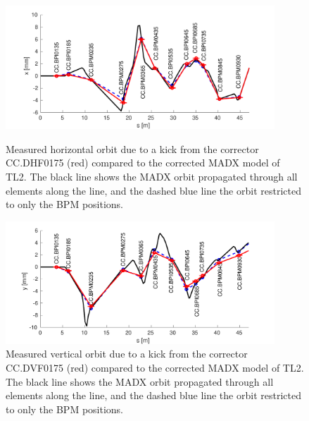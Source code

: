 \begin{figure}
  \centering
  \includegraphics[width=0.9\textwidth]{Figures/optics/modelCorrectedH}
  \caption{Measured horizontal orbit due to a kick from the corrector CC.DHF0175 (red) compared to the corrected MADX model of TL2. The black line shows the MADX orbit propagated through all elements along the line, and the dashed blue line the orbit restricted to only the BPM positions.}
  \label{f:modelCorrectedH}
  \includegraphics[width=0.9\textwidth]{Figures/optics/modelCorrectedV}
  \caption{Measured vertical orbit due to a kick from the corrector CC.DVF0175 (red) compared to the corrected MADX model of TL2. The black line shows the MADX orbit propagated through all elements along the line, and the dashed blue line the orbit restricted to only the BPM positions.}
  \label{f:modelCorrectedV}
\end{figure}


